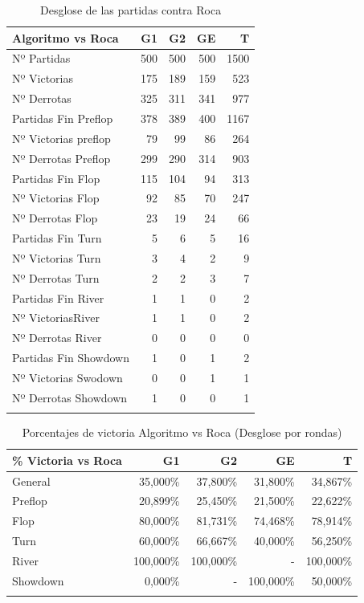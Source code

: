 \begin{longtable}[c]{lrrrr}
\hline
Algoritmo vs Roca & G1 & G2 & GE & T \\ \hline
Nº Partidas & 500 & 500 & 500 & 1500 \\ 
Nº Victorias & 175 & 189 & 159 & 523 \\ 
Nº Derrotas & 325 & 311 & 341 & 977 \\ 
Partidas Fin Preflop & 378 & 389 & 400 & 1167 \\ 
Nº Victorias preflop & 79 & 99 & 86 & 264 \\ 
Nº Derrotas Preflop & 299 & 290 & 314 & 903 \\ 
Partidas Fin Flop & 115 & 104 & 94 & 313 \\ 
Nº Victorias Flop & 92 & 85 & 70 & 247 \\ 
Nº Derrotas Flop & 23 & 19 & 24 & 66 \\ 
Partidas Fin Turn & 5 & 6 & 5 & 16 \\ 
Nº Victorias Turn & 3 & 4 & 2 & 9 \\ 
Nº Derrotas Turn & 2 & 2 & 3 & 7 \\ 
Partidas Fin River & 1 & 1 & 0 & 2 \\ 
Nº VictoriasRiver & 1 & 1 & 0 & 2 \\ 
Nº Derrotas River & 0 & 0 & 0 & 0 \\ 
Partidas Fin Showdown & 1 & 0 & 1 & 2 \\ 
Nº Victorias Swodown & 0 & 0 & 1 & 1 \\ 
Nº Derrotas Showdown & 1 & 0 & 0 & 1 \\ \hline
\caption{Desglose de las partidas contra Roca}
\label{tab:PlaysR}
\end{longtable}

\begin{longtable}[c]{lrrrr}
\hline
\% Victoria vs Roca & G1 & G2 & GE & T \\ \hline
General & 35,000\% & 37,800\% & 31,800\% & 34,867\% \\ 
Preflop & 20,899\% & 25,450\% & 21,500\% & 22,622\% \\ 
Flop & 80,000\% & 81,731\% & 74,468\% & 78,914\% \\ 
Turn & 60,000\% & 66,667\% & 40,000\% & 56,250\% \\ 
River & 100,000\% & 100,000\% & - & 100,000\% \\ 
Showdown & 0,000\% & - & 100,000\% & 50,000\% \\  \hline
\caption{Porcentajes de victoria Algoritmo vs Roca (Desglose por rondas)}
\label{tab:winrateR}
\end{longtable}

